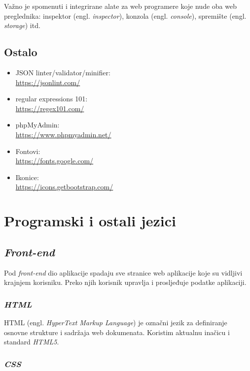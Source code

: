     Važno je spomenuti i integrirane alate za web programere koje nude oba web
    preglednika: inspektor (engl. \textit{inspector}), konzola (engl.
    \textit{console}), spremište (engl. \textit{storage}) itd.

  \subsection{Ostalo}

    \begin{itemize}
      \item JSON linter/validator/minifier: \\ \url{https://jsonlint.com/}
      \item regular expressions 101: \\ \url{https://regex101.com/}
      \item phpMyAdmin: \\ \url{https://www.phpmyadmin.net/}
      \item Fontovi: \\ \url{https://fonts.google.com/}
      \item Ikonice: \\ \url{https://icons.getbootstrap.com/}
    \end{itemize}

\section{Programski i ostali jezici}

  \subsection{\textit{Front-end}}

  Pod \textit{front-end} dio aplikacije spadaju sve stranice web aplikacije koje
  su vidljivi krajnjem korisniku. Preko njih korisnik upravlja i
  prosljeđuje podatke aplikaciji.

    \subsubsection*{\textit{HTML}}

      HTML (engl. \textit{HyperText Markup Language}) je označni jezik za
      definiranje osnovne strukture i sadržaja web dokumenata. Koristim aktualnu
      inačicu i standard \textit{HTML5}.

    \subsubsection*{\textit{CSS}}

